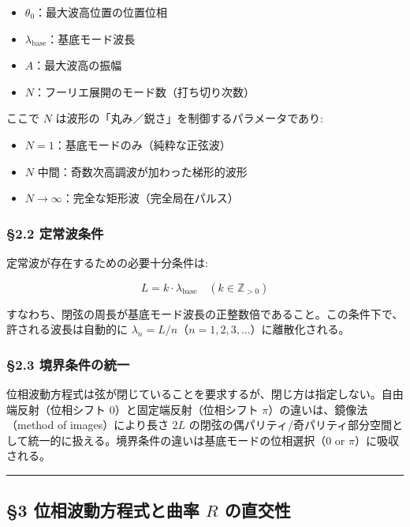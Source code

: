 \documentclass[
  a4paper,11pt]{ltjsarticle}
\providecommand{\tightlist}{%
  \setlength{\itemsep}{0pt}\setlength{\parskip}{0pt}}
\theoremstyle{definition}
\theoremstyle{remark}
\begin{document}
\begin{itemize}
\tightlist
\item
  \(\theta_0\)：最大波高位置の位置位相
\item
  \(\lambda_{\text{base}}\)：基底モード波長
\item
  \(A\)：最大波高の振幅
\item
  \(N\)：フーリエ展開のモード数（打ち切り次数）
\end{itemize}

ここで \(N\) は波形の「丸み／鋭さ」を制御するパラメータであり:

\begin{itemize}
\tightlist
\item
  \(N = 1\)：基底モードのみ（純粋な正弦波）
\item
  \(N\) 中間：奇数次高調波が加わった梯形的波形
\item
  \(N \to \infty\)：完全な矩形波（完全局在パルス）
\end{itemize}

\subsubsection{§2.2 定常波条件}\label{ux5b9aux5e38ux6ce2ux6761ux4ef6}

定常波が存在するための必要十分条件は:

\[L = k \cdot \lambda_{\text{base}} \quad (k \in \mathbb{Z}_{>0})\]

すなわち、閉弦の周長が基底モード波長の正整数倍であること。この条件下で、許される波長は自動的に
\(\lambda_n = L/n\)（\(n = 1, 2, 3, \ldots\)）に離散化される。

\subsubsection{§2.3
境界条件の統一}\label{ux5883ux754cux6761ux4ef6ux306eux7d71ux4e00}

位相波動方程式は弦が閉じていることを要求するが、閉じ方は指定しない。自由端反射（位相シフト
\(0\)）と固定端反射（位相シフト \(\pi\)）の違いは、鏡像法（method of
images）により長さ \(2L\)
の閉弦の偶パリティ/奇パリティ部分空間として統一的に扱える。境界条件の違いは基底モードの位相選択（\(0\)
or \(\pi\)）に吸収される。

\begin{center}\rule{0.5\linewidth}{0.5pt}\end{center}

\subsection{\texorpdfstring{§3 位相波動方程式と曲率 \(R\)
の直交性}{§3 位相波動方程式と曲率 R の直交性}}\label{ux4f4dux76f8ux6ce2ux52d5ux65b9ux7a0bux5f0fux3068ux66f2ux7387-r-ux306eux76f4ux4ea4ux6027}
\end{document}
